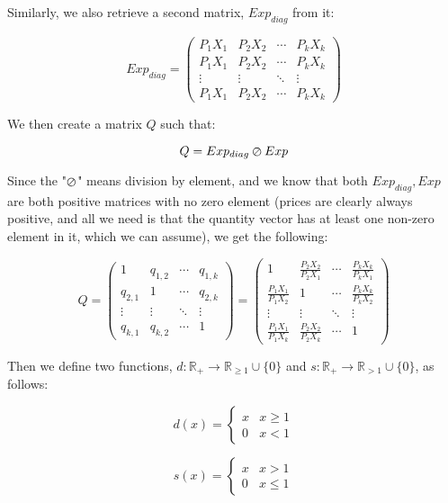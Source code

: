 \documentclass{article} %
\begin{document}
Similarly, we also retrieve a second matrix, $Exp_{diag}$ from it:

\[
Exp_{diag} = 
 \begin{pmatrix}
  P_1X_1 & P_2X_2 & \cdots & P_kX_k \\
  P_1X_1 & P_2X_2 & \cdots & P_kX_k \\
  \vdots  & \vdots  & \ddots & \vdots  \\
  P_1X_1 & P_2X_2 & \cdots & P_kX_k
 \end{pmatrix}
\]

We then create a matrix $Q$ such that:

\[
Q = Exp_{diag} \varoslash Exp
\]

Since the "$\varoslash$" means division by element, and we know that both $Exp_{diag}, Exp$ are both positive matrices with no zero element (prices are clearly always positive, and all we need is that the quantity vector has at least one non-zero element in it, which we can assume), we get the following:

\[
Q = 
 \begin{pmatrix}
  1 & q_{1,2} & \cdots & q_{1,k} \\
  q_{2,1} & 1 & \cdots & q_{2,k} \\
  \vdots & \vdots & \ddots & \vdots \\
  q_{k,1} & q_{k,2} & \cdots & 1
 \end{pmatrix} =
 \begin{pmatrix}
 1 & \frac{P_2X_2}{P_2X_1} & \cdots & \frac{P_kX_k}{P_kX_1} \\[6pt]
 \frac{P_1X_1}{P_1X_2} & 1 & \cdots & \frac{P_kX_k}{P_kX_2} \\[6pt]
 \vdots & \vdots & \ddots & \vdots \\[6pt]
 \frac{P_1X_1}{P_1X_k} & \frac{P_2X_2}{P_2X_k} & \cdots & 1
 \end{pmatrix}
\]

Then we define two functions, $d:\mathbb{R}_{+}\to\mathbb{R}_{\geq1}\cup\{0\}$ and $s:\mathbb{R}_{+}\to\mathbb{R}_{>1}\cup\{0\}$, as follows:

\begin{minipage}{.5\linewidth}
\[ 
d(x)=
 \begin{cases} 
   x & x\geq1 \\
    0 & x<1
 \end{cases}
\]
\end{minipage}
\begin{minipage}{.5\linewidth}
\[
s(x)=
    \begin{cases} 
      x & x>1 \\
      0 & x\leq1
   \end{cases}
\]
\end{minipage}
\end{document}
